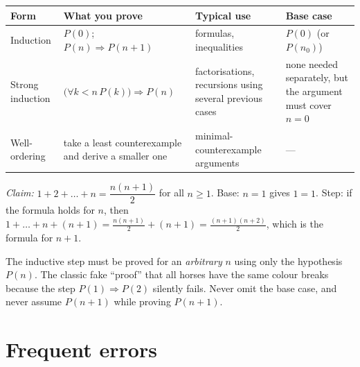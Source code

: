 \begin{center}
	\begin{tabular}{@{}p{2.6cm}p{4.8cm}p{4.2cm}p{2.8cm}@{}}
		\toprule
		\textbf{Form} & \textbf{What you prove} & \textbf{Typical use} & \textbf{Base case}\\
		\midrule
		Induction & $P(0)$; $P(n)\Rightarrow P(n+1)$ & formulas, inequalities & $P(0)$ (or $P(n_0)$)\\
		Strong induction & $\bigl(\forall k<n\,P(k)\bigr)\Rightarrow P(n)$ & factorisations, recursions using several previous cases & none needed separately, but the argument must cover $n=0$\\
		Well-ordering & take a least counterexample and derive a smaller one & minimal-counterexample arguments & ---\\
		\bottomrule
	\end{tabular}
\end{center}

\begin{example}
	\textit{Claim:} $1+2+\dots+n=\dfrac{n(n+1)}2$ for all $n\ge1$. Base: $n=1$ gives $1=1$. Step: if the formula holds for $n$, then $1+\dots+n+(n+1)=\frac{n(n+1)}2+(n+1)=\frac{(n+1)(n+2)}2$, which is the formula for $n+1$.
\end{example}

\begin{warning}
	The inductive step must be proved for an \emph{arbitrary} $n$ using only the hypothesis $P(n)$. The classic fake ``proof'' that all horses have the same colour breaks because the step $P(1)\Rightarrow P(2)$ silently fails. Never omit the base case, and never assume $P(n+1)$ while proving $P(n+1)$.
\end{warning}

\section{Frequent errors}

